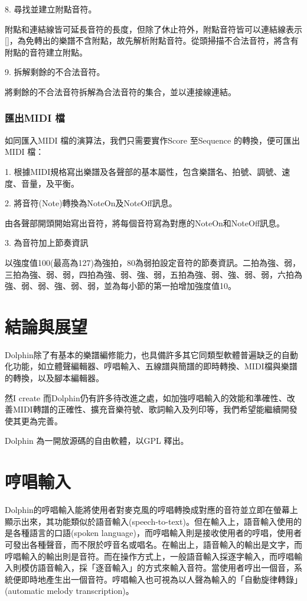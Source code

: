\documentclass[12pt,a4paper,oneside]{report}
\begin{document}
8. 尋找並建立附點音符。

附點和連結線皆可延長音符的長度，但除了休止符外，附點音符皆可以連結線表示[]，為免轉出的樂譜不含附點，故先解析附點音符。從頭掃描不合法音符，將含有附點的音符建立附點。

9. 拆解剩餘的不合法音符。

將剩餘的不合法音符拆解為合法音符的集合，並以連接線連結。

\subsection{匯出MIDI 檔}

如同匯入MIDI 檔的演算法，我們只需要實作Score 至Sequence 的轉換，便可匯出MIDI 檔：

1. 根據MIDI規格寫出樂譜及各聲部的基本屬性，包含樂譜名、拍號、調號、速度、音量，及平衡。 

2. 將音符(Note)轉換為NoteOn及NoteOff訊息。 

由各聲部開頭開始寫出音符，將每個音符寫為對應的NoteOn和NoteOff訊息。

3. 為音符加上節奏資訊

以強度值100(最高為127)為強拍，80為弱拍設定音符的節奏資訊。二拍為強、弱，三拍為強、弱、弱，四拍為強、弱、強、弱，五拍為強、弱、強、弱、弱，六拍為強、弱、弱、強、弱、弱，並為每小節的第一拍增加強度值10。



\chapter{結論與展望}

Dolphin除了有基本的樂譜編修能力，也具備許多其它同類型軟體普遍缺乏的自動化功能，如立體聲編輯器、哼唱輸入、五線譜與簡譜的即時轉換、MIDI檔與樂譜的轉換，以及腳本編輯器。

然I create 而Dolphin仍有許多待改進之處，如加強哼唱輸入的效能和準確性、改善MIDI轉譜的正確性、擴充音樂符號、歌詞輸入及列印等，我們希望能繼續開發使其更為完善。

Dolphin 為一開放源碼的自由軟體，以GPL 釋出。


\appendix

\chapter{哼唱輸入}

Dolphin的哼唱輸入能將使用者對麥克風的哼唱轉換成對應的音符並立即在螢幕上顯示出來，其功能類似於語音輸入(speech-to-text)。但在輸入上，語音輸入使用的是各種語言的口語(spoken language)，而哼唱輸入則是接收使用者的哼唱，使用者可發出各種聲音，而不限於哼音名或唱名。在輸出上，語音輸入的輸出是文字，而哼唱輸入的輸出則是音符。而在操作方式上，一般語音輸入採逐字輸入，而哼唱輸入則模仿語音輸入，採「逐音輸入」的方式來輸入音符。當使用者哼出一個音，系統便即時地產生出一個音符。哼唱輸入也可視為以人聲為輸入的「自動旋律轉錄」(automatic melody transcription)。
\end{document}
